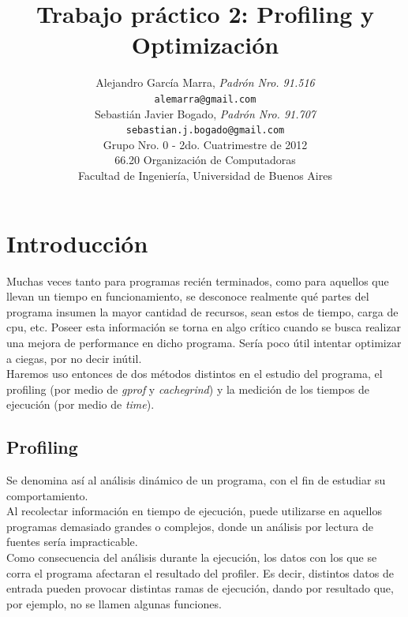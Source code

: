 \documentclass[a4paper,10pt]{article}
\title{		\textbf{Trabajo pr\'actico 2: Profiling y Optimizaci\'on }}
\author{	Alejandro Garc\'ia Marra, \textit{Padr\'on Nro. 91.516}                     \\
            \texttt{ alemarra@gmail.com }                                              \\
            Sebasti\'an Javier Bogado, \textit{Padr\'on Nro. 91.707}                     \\
            \texttt{ sebastian.j.bogado@gmail.com }                                              \\
            \normalsize{Grupo Nro. 0 - 2do. Cuatrimestre de 2012}                       \\
            \normalsize{66.20 Organizaci\'on de Computadoras}                             \\
            \normalsize{Facultad de Ingenier\'ia, Universidad de Buenos Aires}            \\
       }
\date{}
\begin{document}
\maketitle

\thispagestyle{empty}

\begin{abstract}

\end{abstract}

\newpage
\section{Introducci\'on}

Muchas veces tanto para programas reci\'en terminados, como para aquellos que llevan un tiempo en funcionamiento, se desconoce realmente qu\'e partes del programa insumen la mayor cantidad de recursos, sean estos de tiempo, carga de cpu, etc.
Poseer esta informaci\'on se torna en algo cr\'itico cuando se busca realizar una mejora de performance en dicho programa. Ser\'ia poco \'util intentar optimizar a ciegas, por no decir in\'util.\\
Haremos uso entonces de dos m\'etodos distintos en el estudio del programa, el profiling (por medio de \textit{gprof} y \textit{cachegrind}) y la medici\'on de los tiempos de ejecuci\'on (por medio de \textit{time}). 

\subsection{Profiling}

	Se denomina as\'i al an\'alisis din\'amico de un programa, con el fin de estudiar su comportamiento.\\
	Al recolectar informaci\'on en tiempo de ejecuci\'on, puede utilizarse en aquellos programas demasiado grandes o complejos, donde un an\'alisis
 por lectura de fuentes ser\'ia impracticable.\\
	Como consecuencia del an\'alisis durante la ejecuci\'on, los datos con los que se corra el programa afectaran el resultado del profiler. 
 Es decir, distintos datos de entrada pueden provocar distintas ramas de ejecuci\'on, dando por resultado que, por ejemplo, no se llamen algunas funciones.
\end{document}

